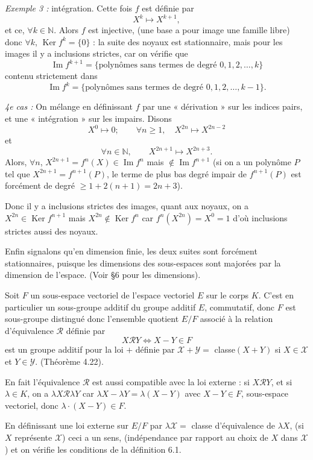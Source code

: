\textit{Exemple 3 :} intégration. Cette fois $f$ est définie par
\[
X^k\longmapsto X^{k+1},
\]
et ce, $\forall k\in\mathbb N$. Alors $f$ est injective, (une base a pour image une famille libre) donc $\forall k$, $\operatorname{Ker}f^k=\{0\}$ : la suite des noyaux est stationnaire, mais pour les images il y a inclusions strictes, car on vérifie que
\[
\operatorname{Im}f^{k+1}=\{\text{polynômes sans termes de degré }0,1,2,\ldots,k\}
\]
contenu strictement dans
\[
\operatorname{Im}f^k=\{\text{polynômes sans termes de degré }0,1,2,\ldots,k-1\}.
\]

\textit{4e cas :} On mélange en définissant $f$ par une « dérivation » sur les indices pairs, et une « intégration » sur les impairs. Disons
\[
X^0\longmapsto0;\qquad \forall n\ge1,\quad X^{2n}\longmapsto X^{2n-2}
\]
et
\[
\forall n\in\mathbb N,\qquad X^{2n+1}\longmapsto X^{2n+3}.
\]
Alors, $\forall n$, $X^{2n+1}=f^n(X)\in\operatorname{Im}f^n$ mais $\notin\operatorname{Im}f^{n+1}$ (si on a un polynôme $P$ tel que $X^{2n+1}=f^{n+1}(P)$, le terme de plus bas degré impair de $f^{n+1}(P)$ est forcément de degré $\ge1+2(n+1)=2n+3$).

Donc il y a inclusions strictes des images, quant aux noyaux, on a $X^{2n}\in\operatorname{Ker}f^{n+1}$ mais $X^{2n}\notin\operatorname{Ker}f^n$ car $f^n(X^{2n})=X^0=1$ d'où inclusions strictes aussi des noyaux.

Enfin signalons qu'en dimension finie, les deux suites sont forcément stationnaires, puisque les dimensions des sous-espaces sont majorées par la dimension de l'espace. (Voir §6 pour les dimensions).


Soit $F$ un sous-espace vectoriel de l'espace vectoriel $E$ sur le corps $K$. C'est en particulier un sous-groupe additif du groupe additif $E$, commutatif, donc $F$ est sous-groupe distingué donc l'ensemble quotient $E/F$ associé à la relation d'équivalence $\mathcal R$ définie par
\[
X\mathcal RY\Longleftrightarrow X-Y\in F
\]
est un groupe additif pour la loi $+$ définie par $\mathcal X+\mathcal Y=$ classe$(X+Y)$ si $X\in\mathcal X$ et $Y\in\mathcal Y$. (Théorème 4.22).

En fait l'équivalence $\mathcal R$ est aussi compatible avec la loi externe : si $X\mathcal RY$, et si $\lambda\in K$, on a $\lambda X\mathcal R\lambda Y$ car $\lambda X-\lambda Y=\lambda(X-Y)$ avec $X-Y\in F$, sous-espace vectoriel, donc $\lambda\cdot(X-Y)\in F$.

En définissant une loi externe sur $E/F$ par $\lambda\mathcal X=$ classe d'équivalence de $\lambda X$, (si $X$ représente $\mathcal X$) ceci a un sens, (indépendance par rapport au choix de $X$ dans $\mathcal X$) et on vérifie les conditions de la définition 6.1.

